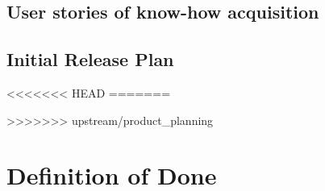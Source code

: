 \documentclass[oneside]{tudelft-report}
\begin{document}
\subsection{User stories of know-how acquisition}
%
\subsection{Initial Release Plan}
<<<<<<< HEAD
%
=======

>>>>>>> upstream/product_planning


\section{Definition of Done}

\printglossaries

\end{document}
